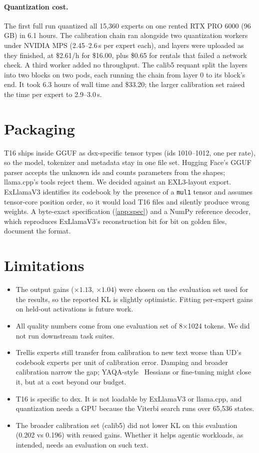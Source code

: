 \documentclass[10pt]{article}
\begin{document}
\paragraph{Quantization cost.}
The first full run quantized all 15{,}360 experts on one rented RTX PRO 6000 (96\,GB) in 6.1 hours. The calibration
chain ran alongside two quantization workers under NVIDIA MPS (2.45--2.6\,s per expert each), and layers were uploaded
as they finished, at \$2.61/h for \$16.00, plus \$0.65 for rentals that failed a network check. A third worker added no
throughput. The calib5 requant split the layers into two blocks on two pods, each running the chain from layer 0 to
its block's end. It took 6.3 hours of wall time and \$33.20; the larger calibration set raised the time per expert to
2.9--3.0\,s.

\section{Packaging}
T16 ships inside GGUF as dsx-specific tensor types (ids 1010--1012, one per rate), so the model, tokenizer and
metadata stay in one file set. Hugging Face's GGUF parser accepts the unknown ids and counts parameters from the
shapes; llama.cpp's tools reject them. We decided against an EXL3-layout export. ExLlamaV3 identifies its codebook by
the presence of a \texttt{mul1} tensor and assumes tensor-core position order, so it would load T16 files and silently
produce wrong weights. A byte-exact specification (\cref{app:spec}) and a NumPy reference decoder, which reproduces
ExLlamaV3's reconstruction bit for bit on golden files, document the format.

\section{Limitations}
\label{sec:limits}
\begin{itemize}\setlength{\itemsep}{1pt}
\item The output gains ($\times 1.13$, $\times 1.04$) were chosen on the evaluation set used for the results, so the
reported KL is slightly optimistic. Fitting per-expert gains on held-out activations is future work.
\item All quality numbers come from one evaluation set of 8$\times$1024 tokens. We did not run downstream task suites.
\item Trellis experts still transfer from calibration to new text worse than UD's codebook experts per unit of
calibration error. Damping and broader calibration narrow the gap; YAQA-style~\cite{yaqa} Hessians or fine-tuning
might close it, but at a cost beyond our budget.
\item T16 is specific to dsx. It is not loadable by ExLlamaV3 or llama.cpp, and quantization needs a GPU because the
Viterbi search runs over 65{,}536 states.
\item The broader calibration set (calib5) did not lower KL on this evaluation (0.202 vs 0.196) with reused gains.
Whether it helps agentic workloads, as intended, needs an evaluation on such text.
\end{itemize}
\end{document}
